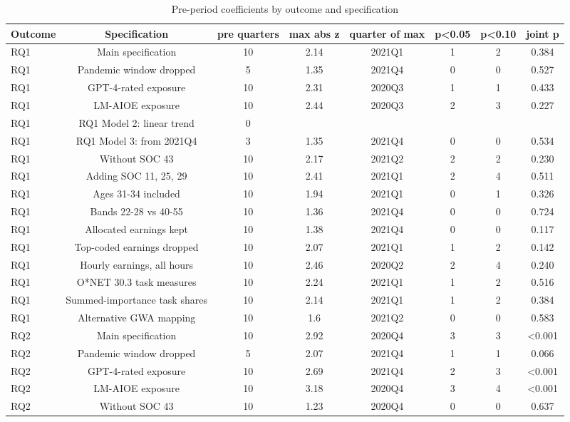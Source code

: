 \begin{table}[htbp]\centering
\caption{Pre-period coefficients by outcome and specification}
\begin{tabular}{lccccccc}
\toprule
Outcome & Specification & pre quarters & max abs z & quarter of max & p<0.05 & p<0.10 & joint p \\
\midrule
RQ1 & Main specification & 10 & 2.14 & 2021Q1 & 1 & 2 & 0.384 \\
RQ1 & Pandemic window dropped & 5 & 1.35 & 2021Q4 & 0 & 0 & 0.527 \\
RQ1 & GPT-4-rated exposure & 10 & 2.31 & 2020Q3 & 1 & 1 & 0.433 \\
RQ1 & LM-AIOE exposure & 10 & 2.44 & 2020Q3 & 2 & 3 & 0.227 \\
RQ1 & RQ1 Model 2: linear trend & 0 &  &  &  &  &  \\
RQ1 & RQ1 Model 3: from 2021Q4 & 3 & 1.35 & 2021Q4 & 0 & 0 & 0.534 \\
RQ1 & Without SOC 43 & 10 & 2.17 & 2021Q2 & 2 & 2 & 0.230 \\
RQ1 & Adding SOC 11, 25, 29 & 10 & 2.41 & 2021Q1 & 2 & 4 & 0.511 \\
RQ1 & Ages 31-34 included & 10 & 1.94 & 2021Q1 & 0 & 1 & 0.326 \\
RQ1 & Bands 22-28 vs 40-55 & 10 & 1.36 & 2021Q4 & 0 & 0 & 0.724 \\
RQ1 & Allocated earnings kept & 10 & 1.38 & 2021Q4 & 0 & 0 & 0.117 \\
RQ1 & Top-coded earnings dropped & 10 & 2.07 & 2021Q1 & 1 & 2 & 0.142 \\
RQ1 & Hourly earnings, all hours & 10 & 2.46 & 2020Q2 & 2 & 4 & 0.240 \\
RQ1 & O*NET 30.3 task measures & 10 & 2.24 & 2021Q1 & 1 & 2 & 0.516 \\
RQ1 & Summed-importance task shares & 10 & 2.14 & 2021Q1 & 1 & 2 & 0.384 \\
RQ1 & Alternative GWA mapping & 10 & 1.6 & 2021Q2 & 0 & 0 & 0.583 \\
RQ2 & Main specification & 10 & 2.92 & 2020Q4 & 3 & 3 & <0.001 \\
RQ2 & Pandemic window dropped & 5 & 2.07 & 2021Q4 & 1 & 1 & 0.066 \\
RQ2 & GPT-4-rated exposure & 10 & 2.69 & 2021Q4 & 2 & 3 & <0.001 \\
RQ2 & LM-AIOE exposure & 10 & 3.18 & 2020Q4 & 3 & 4 & <0.001 \\
RQ2 & Without SOC 43 & 10 & 1.23 & 2020Q4 & 0 & 0 & 0.637 \\

\end{tabular}
\end{table}
